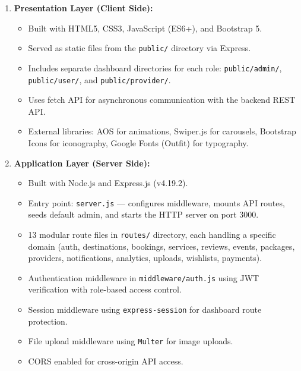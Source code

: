\begin{enumerate}[leftmargin=2em]
    \item \textbf{Presentation Layer (Client Side):}
    \begin{itemize}
        \item Built with HTML5, CSS3, JavaScript (ES6+), and Bootstrap 5.
        \item Served as static files from the \texttt{public/} directory via Express.
        \item Includes separate dashboard directories for each role: \texttt{public/admin/}, \texttt{public/user/}, and \texttt{public/provider/}.
        \item Uses fetch API for asynchronous communication with the backend REST API.
        \item External libraries: AOS for animations, Swiper.js for carousels, Bootstrap Icons for iconography, Google Fonts (Outfit) for typography.
    \end{itemize}

    \item \textbf{Application Layer (Server Side):}
    \begin{itemize}
        \item Built with Node.js and Express.js (v4.19.2).
        \item Entry point: \texttt{server.js} --- configures middleware, mounts API routes, seeds default admin, and starts the HTTP server on port 3000.
        \item 13 modular route files in \texttt{routes/} directory, each handling a specific domain (auth, destinations, bookings, services, reviews, events, packages, providers, notifications, analytics, uploads, wishlists, payments).
        \item Authentication middleware in \texttt{middleware/auth.js} using JWT verification with role-based access control.
        \item Session middleware using \texttt{express-session} for dashboard route protection.
        \item File upload middleware using \texttt{Multer} for image uploads.
        \item CORS enabled for cross-origin API access.
    \end{itemize}


\end{enumerate}
